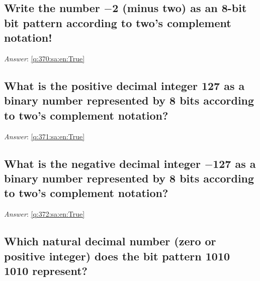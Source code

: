 \documentclass[a4paper,11pt,oneside]{article}
\begin{document}
\begin{sloppypar}
\subsection{Write the number \ensuremath{-}2 (minus two) as an 8-bit bit pattern according to two's complement notation!}

\label{q:370:sa:en:False}

\vspace{2cm}

\noindent\makebox[\textwidth]{\hrulefill}

\vspace{1cm}

\textit{Answer}: \autoref{q:370:sa:en:True}



\subsection{What is the positive decimal integer 127 as a binary number represented by 8 bits according to two's complement notation?}

\label{q:371:sa:en:False}

\vspace{2cm}

\noindent\makebox[\textwidth]{\hrulefill}

\vspace{1cm}

\textit{Answer}: \autoref{q:371:sa:en:True}



\subsection{What is the negative decimal integer \ensuremath{-}127 as a binary number represented by 8 bits according to two's complement notation?}

\label{q:372:sa:en:False}

\vspace{2cm}

\noindent\makebox[\textwidth]{\hrulefill}

\vspace{1cm}

\textit{Answer}: \autoref{q:372:sa:en:True}



\subsection{Which natural decimal number (zero or positive integer) does the bit pattern 1010 1010 represent?}


\end{sloppypar}
\end{document}
